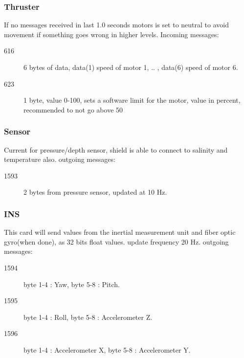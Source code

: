 \subsubsection{Thruster}
If no messages received in last 1.0 seconds motors is set to neutral to avoid movement if something goes wrong in higher levels.
Incoming messages:
\begin{description}
  \item[616] 6 bytes of data, data(1) speed of motor 1, .. , data(6) speed of motor 6.
  \item[623] 1 byte, value 0-100, sets a software limit for the motor, value in percent, recommended to not go above 50%
\end{description}


\subsubsection{Sensor}
Current for pressure/depth sensor, shield is able to connect to salinity and temperature also.\newline
outgoing messages:
\begin{description}
  \item[1593] 2 bytes from pressure sensor, updated at 10 Hz.
\end{description}


\subsubsection{INS}
This card will send values from the inertial measurement unit and fiber optic gyro(when done), as 32 bits float values.\newline
update frequency 20 Hz.\newline
outgoing messages:
\begin{description}
  \item[1594] byte 1-4 : Yaw, byte 5-8 : Pitch.
  \item[1595] byte 1-4 : Roll, byte 5-8 : Accelerometer Z.
  \item[1596] byte 1-4 : Accelerometer X, byte 5-8 : Accelerometer Y.
\end{description}



